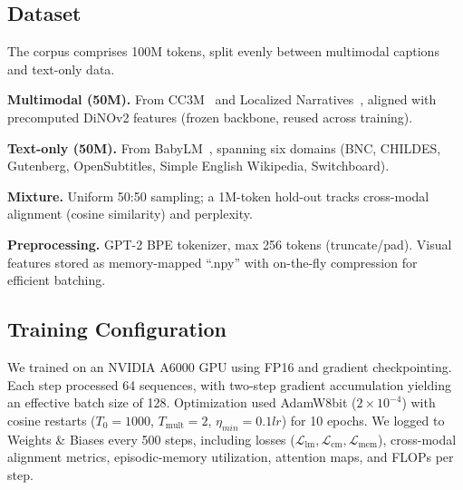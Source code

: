 \subsection{Dataset}
The corpus comprises 100M tokens, split evenly between multimodal captions and text-only data.  

\textbf{Multimodal (50M).} From CC3M~\citep{sharma-CC3M-2018} and Localized Narratives~\citep{ponttuset-localized-narratives-2020}, aligned with precomputed DiNOv2 features (frozen backbone, reused across training).  

\textbf{Text-only (50M).} From BabyLM~\citep{Charpentier-babylm-2025}, spanning six domains (BNC, CHILDES, Gutenberg, OpenSubtitles, Simple English Wikipedia, Switchboard).  

\textbf{Mixture.} Uniform 50:50 sampling; a 1M-token hold-out tracks cross-modal alignment (cosine similarity) and perplexity.  

\textbf{Preprocessing.} GPT-2 BPE tokenizer, max 256 tokens (truncate/pad). Visual features stored as memory-mapped ``.npy'' with on-the-fly compression for efficient batching.

\subsection{Training Configuration}
We trained on an NVIDIA A6000 GPU using FP16 and gradient checkpointing. Each step processed 64 sequences, with two-step gradient accumulation yielding an effective batch size of 128. Optimization used AdamW8bit ($2\!\times\!10^{-4}$) with cosine restarts ($T_0{=}1000$, $T_{\text{mult}}{=}2$, $\eta_{min}{=}0.1lr$) for 10 epochs. We logged to Weights \& Biases every 500 steps, including losses ($\mathcal{L}_{\text{lm}}, \mathcal{L}_{\text{cm}}, \mathcal{L}_{\text{mem}}$), cross-modal alignment metrics, episodic-memory utilization, attention maps, and FLOPs per step.




